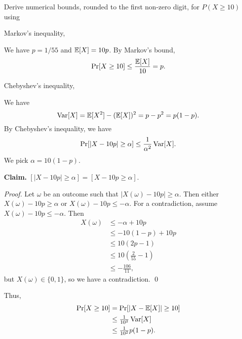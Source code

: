 Derive numerical bounds, rounded to the first non-zero digit, for $P(X \geq 10)$ using
\begin{subparts}
    \subpart[3] Markov's inequality,
    \begin{solution}
        We have $p = 1/55$ and $\mathbb E[X] = 10p$. By Markov's bound,
        \[
            \Pr[X \geq 10] \leq \frac{\mathbb E[X]}{10} = p.
        \]
    \end{solution}

    \subpart[5] Chebyshev's inequality,
    \begin{solution}
        We have
        \[ \operatorname{Var}[X] = \mathbb E[X^2] - (\mathbb E[X])^2 = p - p^2 = p(1-p). \]
        By Chebyshev's inequality, we have
        \[
            \Pr[\lvert X - 10p \rvert \geq \alpha] \leq \frac{1}{\alpha^2} \operatorname{Var}[X].
        \]
        We pick $\alpha = 10(1-p)$.

        \vspace{0.5em}
        \textbf{Claim.} $[\lvert X - 10p \rvert \geq \alpha] = [X - 10p \geq \alpha]$.

        \textit{Proof.} Let $\omega$ be an outcome such that $\lvert X(\omega) - 10p \rvert \geq \alpha$. Then either $X(\omega) - 10p \geq \alpha$ or $X(\omega) - 10p \leq - \alpha$. For a contradiction, assume $X(\omega) - 10p \leq - \alpha$. Then
        \begin{align*}
            X(\omega) & \leq -\alpha + 10p                  \\
                      & \leq -10(1-p) + 10p                 \\
                      & \leq 10(2p-1)                       \\
                      & \leq 10\left(\tfrac{2}{55}-1\right) \\
                      & \leq -\tfrac{106}{11},
        \end{align*}
        but $X(\omega) \in \{0, 1\}$, so we have a contradiction. \qed
        \vspace{0.5em}

        Thus,
        \begin{align*}
            \Pr[X \geq 10] & = \Pr[\lvert X - \mathbb E[X]\rvert \geq 10] \\
                           & \leq \tfrac{1}{10^2} \operatorname{Var}[X]          \\
                           & \leq \tfrac{1}{10^2} p(1-p).
        \end{align*}
    \end{solution}


\end{subparts}
